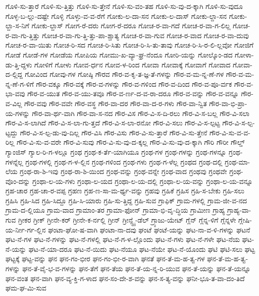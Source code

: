 {ಗೊಳಿ-ಸು-ತ್ತಾರೆ
ಗೊಳಿ-ಸು-ತ್ತಿತ್ತು
ಗೊಳಿ-ಸು-ತ್ತೇನೆ
ಗೊಳಿ-ಸು-ವಂ-ತಹ
ಗೊಳಿ-ಸು-ವು-ದ-ಕ್ಕಾಗಿ
ಗೊಳಿ-ಸು-ವುದೂ
ಗೊಳ್ಳ-ಬ-ಲ್ಲು-ದಷ್ಟೇ
ಗೊಳ್ಳಿ
ಗೊಳ್ಳು-ವ-ವ-ರೆಗೆ
ಗೋಕು-ಲ-ದಾ-ಸನ
ಗೋಕು-ಲ-ದಾಸ್
ಗೋಕು-ಲ್ದಾ-ಸನ
ಗೋಕು-ಲ್ದಾ-ಸ-ನಿಗೆ
ಗೋಕು-ಲ್ದಾಸ್
ಗೋಗ-ರೆ-ದರು
ಗೋಗ-ರೆ-ದರೂ
ಗೋಚ-ರ-ವಾ-ಗದೆ
ಗೋಚ-ರ-ವಾ-ಗ-ಲಿಲ್ಲ
ಗೋಚ-ರ-ವಾ-ಗು-ತ್ತಿತ್ತು
ಗೋಚ-ರ-ವಾ-ಗು-ತ್ತಿ-ತ್ತು-ಪಾ-ಶ್ಚಾತ್ಯ
ಗೋಚ-ರ-ವಾ-ಗುವ
ಗೋಚ-ರ-ವಾದ
ಗೋಚ-ರ-ವಾ-ದುವು
ಗೋಚ-ರ-ವಾ-ಯಿತು
ಗೋಚ-ರಿ-ಸದ
ಗೋಚ-ರಿ-ಸಿತು
ಗೋಚ-ರಿ-ಸಿ-ತು-ತಾವು
ಗೋಚ-ರಿ-ಸಿ-ರ-ಲಿ-ಲ್ಲವೋ
ಗೋಜಿಗೆ
ಗೋಡೆ
ಗೋಡೆ-ಗಳ
ಗೋಡೆಯ
ಗೋಪಿಯ
ಗೋಮು-ಖ-ವ್ಯಾ-ಘ್ರ-ನೆಂದೂ
ಗೋರಿ-ಯನ್ನು
ಗೋಲ್ಕೊಂ-ಡದ
ಗೋಳಾ-ಡು-ತ್ತಿ-ದ್ದಳು
ಗೋಳಿಗೆ
ಗೋಳು
ಗೋವ-ರ್ಧನ
ಗೋವ-ಳ-ರಿಂದ
ಗೋವಾ
ಗೋವಾಕ್ಕೆ
ಗೋವಾಗೆ
ಗೋವಾದ
ಗೋವಾ-ದ-ಲ್ಲಿದ್ದ
ಗೋವಿಂದ
ಗೋವು-ಗಳ
ಗೋಷ್ಠಿ
ಗೌರವ
ಗೌರ-ವ-ಕೃ-ತ-ಜ್ಞ-ತೆ-ಗಳನ್ನು
ಗೌರ-ವ-ಮ-ನ್ನ-ಣೆ-ಗಳ
ಗೌರ-ವ-ಮ-ನ್ನ-ಣೆ-ಗ-ಳಿಗೆ
ಗೌರ-ವಕ್ಕೂ
ಗೌರ-ವಕ್ಕೆ
ಗೌರ-ವ-ಗಳನ್ನು
ಗೌರ-ವ-ಗಳಿಂದ
ಗೌರ-ವ-ದಿಂದ
ಗೌರ-ವ-ಪೂ-ರ್ವಕ
ಗೌರ-ವ-ಭಾ-ವವು
ಗೌರ-ವ-ಯುತ
ಗೌರ-ವ-ಯು-ತವೂ
ಗೌರ-ವ-ರ್ಣ-ದ-ವ-ರಾ-ದರೂ
ಗೌರ-ವ-ವನ್ನು
ಗೌರ-ವ-ವನ್ನೂ
ಗೌರ-ವ-ವಿಲ್ಲ
ಗೌರ-ವವು
ಗೌರ-ವವೇ
ಗೌರ-ವಸ್ಥ
ಗೌರ-ವಾ-ದರ
ಗೌರ-ವಾ-ದ-ರ-ಗಳು
ಗೌರ-ವಾ-ನ್ವಿತ
ಗೌರ-ವಾ-ಭಿ-ಪ್ರಾ-ಯ-ಗಳನ್ನು
ಗೌರ-ವಾ-ರ್ಥ-ವಾಗಿ
ಗೌರ-ವಾ-ಸ-ನದ
ಗೌರ-ವಿಸ
ಗೌರ-ವಿ-ಸ-ದಿ-ರಲು
ಗೌರ-ವಿ-ಸ-ಬಲ್ಲ
ಗೌರ-ವಿ-ಸಲಾ
ಗೌರ-ವಿ-ಸ-ಲಾಗಿದೆ
ಗೌರ-ವಿ-ಸ-ಲಾ-ಗು-ತ್ತದೆ
ಗೌರ-ವಿ-ಸ-ಲಾ-ರನೋ
ಗೌರ-ವಿ-ಸಲು
ಗೌರ-ವಿ-ಸ-ಲ್ಪಟ್ಟ
ಗೌರ-ವಿ-ಸ-ಲ್ಪ-ಟ್ಟದ್ದು
ಗೌರ-ವಿ-ಸ-ಲ್ಪ-ಡು-ವು-ದಿಲ್ಲ
ಗೌರ-ವಿಸಿ
ಗೌರ-ವಿಸು
ಗೌರ-ವಿ-ಸು-ತ್ತಾರೆ
ಗೌರ-ವಿ-ಸು-ತ್ತೇನೆ
ಗೌರ-ವಿ-ಸು-ವ-ವ-ರಿಲ್ಲ
ಗೌರ-ವಿ-ಸು-ವ-ವರೇ
ಗೌರ-ವಿ-ಸುವು
ಗೌರ-ವಿ-ಸು-ವು-ದ-ಕ್ಕಲ್ಲ
ಗೌರ-ವಿ-ಸು-ವು-ದ-ಕ್ಕಾಗಿ
ಗೌರಿ
ಗೌರೀ
ಗೌಲ್ಡ್
ಗ್ಯಾಂಜಿಸ್
ಗ್ಯಾಲ-ರಿ-ಗ-ಳಲ್ಲೂ
ಗ್ರಂಥ
ಗ್ರಂಥ-ಕ-ರ್ತೆ-ಯಾಗಿಯೂ
ಗ್ರಂಥ-ಗಳ
ಗ್ರಂಥ-ಗಳನ್ನು
ಗ್ರಂಥ-ಗಳನ್ನೂ
ಗ್ರಂಥ-ಗಳನ್ನೆಲ್ಲ
ಗ್ರಂಥ-ಗಳಲ್ಲಿ
ಗ್ರಂಥ-ಗ-ಳ-ಲ್ಲಿನ
ಗ್ರಂಥ-ಗಳಿಂದ
ಗ್ರಂಥ-ಗಳು
ಗ್ರಂಥ-ಗ-ಳೆಲ್ಲ
ಗ್ರಂಥದ
ಗ್ರಂಥ-ದಲ್ಲಿ
ಗ್ರಂಥ-ಮಾ-ಲೆಯ
ಗ್ರಂಥ-ರಾ-ಶಿ-ಇವು
ಗ್ರಂಥ-ರಾ-ಶಿ-ಯಿಂದ
ಗ್ರಂಥ-ವನ್ನು
ಗ್ರಂಥ-ವನ್ನೇ
ಗ್ರಂಥ-ವಾದ
ಗ್ರಂಥವು
ಗ್ರಂಥವೇ
ಗ್ರಂಥ-ವೊಂ-ದನ್ನು
ಗ್ರಂಥಾ-ಲ-ಯ-ಗಳು
ಗ್ರಂಥಾ-ಲ-ಯದ
ಗ್ರಂಥಾ-ಲ-ಯ-ದಲ್ಲಿ
ಗ್ರಂಥಾ-ಲ-ಯ-ವನ್ನು
ಗ್ರಂಥಾ-ಲ-ಯ-ವನ್ನೂ
ಗ್ರಹ-ಚಾರ
ಗ್ರಹ-ಚಾ-ರ-ವಪ್ಪ
ಗ್ರಹಣ
ಗ್ರಹ-ಣ-ಸಾ-ಮ-ರ್ಥ್ಯ-ವನ್ನು
ಗ್ರಹವು
ಗ್ರಹಿಕೆ
ಗ್ರಹಿಸ
ಗ್ರಹಿ-ಸ-ಬೇಕು
ಗ್ರಹಿ-ಸಲು
ಗ್ರಹಿಸಿ
ಗ್ರಹಿ-ಸಿದ
ಗ್ರಹಿ-ಸಿದ್ದೂ
ಗ್ರಹಿ-ಸಿ-ಯಾರು
ಗ್ರಹಿ-ಸು-ತ್ತಿದ್ದ
ಗ್ರಹಿ-ಸುವ
ಗ್ರಾಫಿಕ್
ಗ್ರಾಮ-ಗಳಲ್ಲಿ
ಗ್ರಾಮ-ಜೀ-ವ-ನದ
ಗ್ರಾಮ-ದ-ಲ್ಲಿಯೂ
ಗ್ರಾಮ-ವಾದ
ಗ್ರಾಮಾಂ-ತರ
ಗ್ರಾಮಾ-ಫೋನ್
ಗ್ರಾಮಾ-ಭಿ-ವೃ-ದ್ಧಿಯ
ಗ್ರಾಮೀಣ
ಗ್ರಾಹ್ಯ
ಗ್ರಾಹ್ಯ-ವಾ-ಗುವ
ಗ್ರೀಕರ
ಗ್ರೀಕ್
ಗ್ರೀನೇ-ಕರ್
ಗ್ರೀನೇ-ಕ-ರ್ನಲ್ಲಿ
ಗ್ರೀನ್
ಗ್ರೀನ್ಸ್ಟೈ-ಡೆಲ್
ಗ್ರ್ಯಾಜು-ಯೇಟ್
ಗ್ಲೆನ್
ಗ್ಲೆನ್ನ-ಳಿಗೆ
ಗ್ಲೆನ್ನಳೇ
ಗ್ಲೇಷಿ-ಯ-ರ್ನೀ-ರ್ಗ-ಲ್ಲಿನ
ಘಂಟಾ-ಘೋ-ಷ-ವಾಗಿ
ಘಂಟಾ-ನಾ-ದವು
ಘಂಟೆ
ಘಂಟೆ-ಯನ್ನು
ಘಟ-ನಾ-ವ-ಳಿ-ಗಳನ್ನು
ಘಟನೆ
ಘಟ-ನೆ-ಗಳ
ಘಟ-ನೆ-ಗಳನ್ನು
ಘಟ-ನೆ-ಗಳಲ್ಲಿ
ಘಟ-ನೆ-ಗ-ಳ-ಲ್ಲೊಂದು
ಘಟ-ನೆ-ಗಳು
ಘಟ-ನೆ-ಗಳೇ
ಘಟ-ನೆಯ
ಘಟ-ನೆ-ಯನ್ನು
ಘಟ-ನೆ-ಯಾ-ದರೂ
ಘಟ-ನೆ-ಯಿದು
ಘಟ-ನೆಯೂ
ಘಟ-ನೆಯೇ
ಘಟ-ನೆ-ಯೊಂದು
ಘಟಿ
ಘಟಿ-ಸಲು
ಘಟ್ಟ
ಘಟ್ಟಕ್ಕೆ
ಘಟ್ಟ-ವನ್ನು
ಘನ
ಘನ-ಗಂ-ಭೀರ
ಘನ-ಗಂ-ಭೀ-ರ-ವಾಗಿ
ಘನತೆ
ಘನ-ತೆ-ಮ-ಹ-ತ್ವ-ಗಳ
ಘನ-ತೆ-ಮ-ಹ-ತ್ವ-ಗಳನ್ನು
ಘನ-ತೆ-ವೈ-ಭ-ವ-ಗಳನ್ನು
ಘನ-ತೆಗೆ
ಘನ-ತೆಯ
ಘನ-ತೆ-ಯ-ನ್ನ-ರಿ-ಯುವ
ಘನ-ತೆ-ಯನ್ನು
ಘನ-ತೆ-ಯನ್ನೂ
ಘನ-ವಂತ
ಘನ-ವಾಗಿ
ಘನ-ವ್ಯ-ಕ್ತಿ-ಗ-ಳಾದ
ಘನ-ಸಂ-ದೇ-ಶ-ವನ್ನು
ಘನ-ಸ-ತ್ಯ-ವನ್ನು
ಘನೀ-ಭೂ-ತ-ವಾ-ದಂ-ತಿದೆ
ಘಮ-ಘ-ಮಿ-ಸುವ
}
